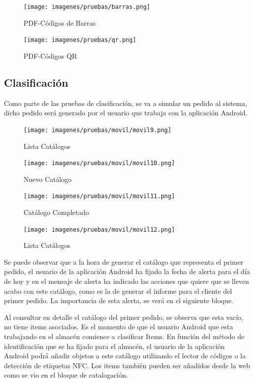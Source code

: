 \documentclass[a4paper,11pt]{book}
\begin{document}
\begin{figure}[H]
  \texttt{[image: imagenes/pruebas/barras.png]}
  \caption{PDF-Códigos de Barras}
\endminipage\hfill
{}
  \texttt{[image: imagenes/pruebas/qr.png]}
  \caption{PDF-Códigos QR}
\endminipage\hfill

\end{figure}


\subsection{Clasificación}

Como parte de las pruebas de clasificación, se va a simular un pedido al sistema, dicho pedido será generado por el usuario que trabaja con la aplicación Android. 

\begin{figure}[H]
  \texttt{[image: imagenes/pruebas/movil/movil9.png]}
  \caption{Lista Catálogos}
\endminipage\hfill
{}
  \texttt{[image: imagenes/pruebas/movil/movil10.png]}
  \caption{Nuevo Catálogo}
\endminipage\hfill
\end{figure}

\begin{figure}[H]
  \texttt{[image: imagenes/pruebas/movil/movil11.png]}
  \caption{Catálogo Completado}
\endminipage\hfill
{}
  \texttt{[image: imagenes/pruebas/movil/movil12.png]}
  \caption{Lista Catálogos}
\endminipage\hfill
\end{figure}

Se puede observar que a la hora de generar el catálogo que representa el primer pedido, el usuario de la aplicación Android ha fijado la fecha de alerta para el día de hoy y en el mensaje de alerta ha indicado las acciones que quiere que se lleven acabo con este catálogo, como es la de generar el informe para el cliente del primer pedido. La importancia de esta alerta, se verá en el siguiente bloque. 

Al consultar en detalle el catálogo del primer pedido, se observa que esta vacío, no tiene items asociados. Es el momento de que el usuario Android que esta trabajando en el almacén comience a clasificar Items. En función del método de identificación que se ha fijado para el almacén, el usuario de la aplicación Android podrá añadir objetos a este catálogo utilizando el lector de códigos o la detección de etiquetas NFC.  Los items también pueden ser añadidos desde la web como se vio en el bloque de catalogación.  
\end{document}
